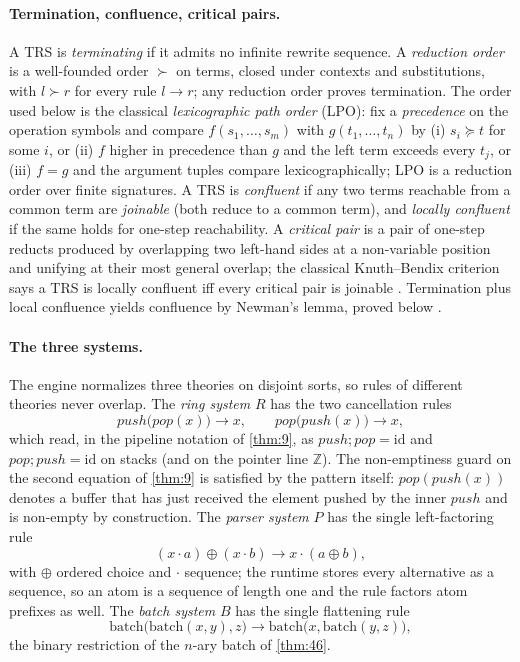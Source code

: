\paragraph{Termination, confluence, critical pairs.}
A TRS is \emph{terminating} if it admits no infinite rewrite sequence. A
\emph{reduction order} is a well-founded order $\succ$ on terms, closed
under contexts and substitutions, with $l \succ r$ for every rule $l \to r$;
any reduction order proves termination. The order used below is the
classical \emph{lexicographic path order} (LPO): fix a \emph{precedence} on
the operation symbols and compare $f (s_1, \ldots, s_m)$ with
$g (t_1, \ldots, t_n)$ by (i) $s_i \succeq t$ for some $i$, or (ii) $f$
higher in precedence than $g$ and the left term exceeds every $t_j$, or
(iii) $f = g$ and the argument tuples compare lexicographically; LPO is a
reduction order over finite signatures. A TRS is \emph{confluent} if any
two terms reachable from a common term are \emph{joinable} (both reduce to
a common term), and \emph{locally confluent} if the same holds for one-step
reachability. A \emph{critical pair} is a pair of one-step reducts produced
by overlapping two left-hand sides at a non-variable position and unifying
at their most general overlap; the classical Knuth--Bendix criterion says a
TRS is locally confluent iff every critical pair is joinable
\cite{knuthbendix}. Termination plus local confluence yields confluence by
Newman's lemma, proved below \cite{newman}.

\paragraph{The three systems.}
The engine normalizes three theories on disjoint sorts, so rules of
different theories never overlap. The \emph{ring system} $R$ has the two
cancellation rules
\[
\mathit{push}\bigl (\mathit{pop} (x)\bigr) \to x, \qquad
\mathit{pop}\bigl (\mathit{push} (x)\bigr) \to x ,
\]
which read, in the pipeline notation of \autoref{thm:9}, as
$\mathit{push};\mathit{pop} = \mathrm{id}$ and
$\mathit{pop};\mathit{push} = \mathrm{id}$ on stacks (and on the pointer
line $\mathbb{Z}$). The non-emptiness guard on
the second equation of \autoref{thm:9} is satisfied by the pattern itself:
$\mathit{pop} (\mathit{push} (x))$ denotes a buffer that has just received
the element pushed by the inner $\mathit{push}$ and is non-empty by
construction. The \emph{parser system} $P$ has the single left-factoring
rule
\[
(x \cdot a) \oplus (x \cdot b) \to x \cdot (a \oplus b) ,
\]
with $\oplus$ ordered choice and $\cdot$ sequence; the runtime stores every
alternative as a sequence, so an atom is a sequence of length one and the
rule factors atom prefixes as well. The \emph{batch system} $B$ has the
single flattening rule
\[
\mathrm{batch}\bigl (\mathrm{batch} (x,y), z\bigr) \to
\mathrm{batch}\bigl (x, \mathrm{batch} (y,z)\bigr),
\]
the binary restriction of the $n$-ary batch of \autoref{thm:46}.

